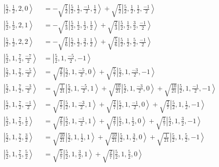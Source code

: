 \documentclass{report}
\newcommand{\ket}[1]{\left| #1 \right>} %
\begin{document}
\begin{align*}
\ket{ \frac{5}{2} ,  \frac{1}{2} ,  2 ,  0  } &=  - \sqrt{  \frac{1}{2}  } \ket{ \frac{5}{2} ,  \frac{1}{2} ,  \frac{-1}{2} ,  \frac{1}{2}  } + \sqrt{  \frac{1}{2}  } \ket{ \frac{5}{2} ,  \frac{1}{2} ,  \frac{1}{2} ,  \frac{-1}{2}  } \\
\ket{ \frac{5}{2} ,  \frac{1}{2} ,  2 ,  1  } &=  - \sqrt{  \frac{1}{3}  } \ket{ \frac{5}{2} ,  \frac{1}{2} ,  \frac{1}{2} ,  \frac{1}{2}  } + \sqrt{  \frac{2}{3}  } \ket{ \frac{5}{2} ,  \frac{1}{2} ,  \frac{3}{2} ,  \frac{-1}{2}  } \\
\ket{ \frac{5}{2} ,  \frac{1}{2} ,  2 ,  2  } &=  - \sqrt{  \frac{1}{6}  } \ket{ \frac{5}{2} ,  \frac{1}{2} ,  \frac{3}{2} ,  \frac{1}{2}  } + \sqrt{  \frac{5}{6}  } \ket{ \frac{5}{2} ,  \frac{1}{2} ,  \frac{5}{2} ,  \frac{-1}{2}  } \\
\ket{ \frac{5}{2} ,  1 ,  \frac{7}{2} ,  \frac{-7}{2}  } &=  \ket{ \frac{5}{2} ,  1 ,  \frac{-5}{2} ,  -1  } \\
\ket{ \frac{5}{2} ,  1 ,  \frac{7}{2} ,  \frac{-5}{2}  } &=  \sqrt{  \frac{2}{7}  } \ket{ \frac{5}{2} ,  1 ,  \frac{-5}{2} ,  0  } + \sqrt{  \frac{5}{7}  } \ket{ \frac{5}{2} ,  1 ,  \frac{-3}{2} ,  -1  } \\
\ket{ \frac{5}{2} ,  1 ,  \frac{7}{2} ,  \frac{-3}{2}  } &=  \sqrt{  \frac{1}{21}  } \ket{ \frac{5}{2} ,  1 ,  \frac{-5}{2} ,  1  } + \sqrt{  \frac{10}{21}  } \ket{ \frac{5}{2} ,  1 ,  \frac{-3}{2} ,  0  } + \sqrt{  \frac{10}{21}  } \ket{ \frac{5}{2} ,  1 ,  \frac{-1}{2} ,  -1  } \\
\ket{ \frac{5}{2} ,  1 ,  \frac{7}{2} ,  \frac{-1}{2}  } &=  \sqrt{  \frac{1}{7}  } \ket{ \frac{5}{2} ,  1 ,  \frac{-3}{2} ,  1  } + \sqrt{  \frac{4}{7}  } \ket{ \frac{5}{2} ,  1 ,  \frac{-1}{2} ,  0  } + \sqrt{  \frac{2}{7}  } \ket{ \frac{5}{2} ,  1 ,  \frac{1}{2} ,  -1  } \\
\ket{ \frac{5}{2} ,  1 ,  \frac{7}{2} ,  \frac{1}{2}  } &=  \sqrt{  \frac{2}{7}  } \ket{ \frac{5}{2} ,  1 ,  \frac{-1}{2} ,  1  } + \sqrt{  \frac{4}{7}  } \ket{ \frac{5}{2} ,  1 ,  \frac{1}{2} ,  0  } + \sqrt{  \frac{1}{7}  } \ket{ \frac{5}{2} ,  1 ,  \frac{3}{2} ,  -1  } \\
\ket{ \frac{5}{2} ,  1 ,  \frac{7}{2} ,  \frac{3}{2}  } &=  \sqrt{  \frac{10}{21}  } \ket{ \frac{5}{2} ,  1 ,  \frac{1}{2} ,  1  } + \sqrt{  \frac{10}{21}  } \ket{ \frac{5}{2} ,  1 ,  \frac{3}{2} ,  0  } + \sqrt{  \frac{1}{21}  } \ket{ \frac{5}{2} ,  1 ,  \frac{5}{2} ,  -1  } \\
\ket{ \frac{5}{2} ,  1 ,  \frac{7}{2} ,  \frac{5}{2}  } &=  \sqrt{  \frac{5}{7}  } \ket{ \frac{5}{2} ,  1 ,  \frac{3}{2} ,  1  } + \sqrt{  \frac{2}{7}  } \ket{ \frac{5}{2} ,  1 ,  \frac{5}{2} ,  0  } \\

\end{align*}
\end{document}
